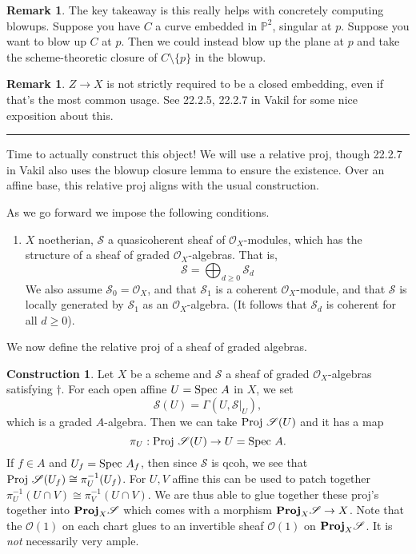 \documentclass[10pt,reqno]{amsart}
\theoremstyle{definition}
\newtheorem{construction}[theorem]{Construction}
\newtheorem{remark}[theorem]{Remark}
\theoremstyle{remark}
\numberwithin{equation}{section}
\numberwithin{theorem}{section}
\newcommand{\OO}{{\mathcal O}}
\newcommand{\spec}{\textup{Spec }}
\newcommand{\proj}{\textup{Proj }}
\newcommand{\bproj}{\textbf{\textup{Proj}}}
\newcommand{\SSS}{{\mathscr S}}
\newcommand{\PP}{{\mathbb P}}
\begin{document}
\begin{remark} The key takeaway is this really helps with concretely computing blowups. Suppose you have $C$ a curve embedded in $\PP^2$, singular at $p$. Suppose you want to blow up $C$ at $p$. Then we could instead blow up the plane at $p$ and take the scheme-theoretic closure of $C \setminus \{p\}$ in the blowup. 
\end{remark}

\begin{remark} $Z \to X$ is not strictly required to be a closed embedding, even if that's the most common usage. See 22.2.5, 22.2.7 in Vakil for some nice exposition about this. 
\end{remark}

\hrule
\vspace{1em}

Time to actually construct this object! We will use a relative proj, though 22.2.7 in Vakil also uses the blowup closure lemma to ensure the existence. Over an affine base, this relative proj aligns with the usual construction. 

As we go forward we impose the following conditions.

\begin{enumerate}[($\dagger$)]
\item $X$ noetherian, $\SSS$ a quasicoherent sheaf of $\OO_X$-modules, which has the structure of a sheaf of graded $\OO_X$-algebras. That is, 
\[\SSS = \bigoplus_{d \ge 0} \SSS_d\]
We also assume $\SSS_0 = \OO_X$, and that $\SSS_1$ is a coherent $\OO_X$-module, and that $\SSS$ is locally generated by $\SSS_1$ as an $\OO_X$-algebra. (It follows that $\SSS_d$ is coherent for all $d \ge 0$).
\end{enumerate}

We now define the relative proj of a sheaf of graded algebras.

\begin{construction} Let $X$ be a scheme and $\SSS$ a sheaf of graded $\OO_X$-algebras satisfying $\dagger$. For each open affine $U = \spec A$ in $X$, we set
\[\SSS(U) = \Gamma(U, \SSS|_{U}),\]
which is a graded $A$-algebra. Then we can take $\proj \SSS(U)$ and it has a map 
\[\pi_U: \proj \SSS(U) \to U = \spec A.\]
If $f \in A$ and $U_f = \spec A_f$, then since $\SSS$ is qcoh, we see that $\proj \SSS(U_f) \cong \pi_U^{-1}(U_f)$. For $U,V$ affine this can be used to patch together $\pi_U^{-1}(U \cap V) \cong \pi_V^{-1}(U \cap V)$. We are thus able to glue together these proj's together into $\bproj_X \SSS$ which comes with a morphism $\bproj_X \SSS \to X$. Note that the $\OO(1)$ on each chart glues to an invertible sheaf $\OO(1)$ on $\bproj_X \SSS$. It is \textit{not} necessarily very ample.
\end{construction}
\end{document}

